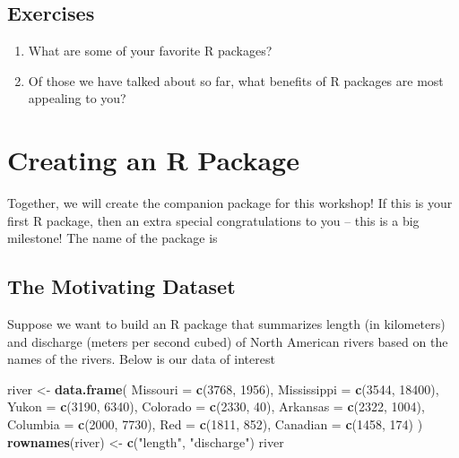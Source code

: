 \documentclass[
]{book}
\newenvironment{Shaded}{\begin{snugshade}}{\end{snugshade}}
\newcommand{\DataTypeTok}[1]{\textcolor[rgb]{0.13,0.29,0.53}{#1}}
\newcommand{\DecValTok}[1]{\textcolor[rgb]{0.00,0.00,0.81}{#1}}
\newcommand{\KeywordTok}[1]{\textcolor[rgb]{0.13,0.29,0.53}{\textbf{#1}}}
\newcommand{\NormalTok}[1]{#1}
\newcommand{\StringTok}[1]{\textcolor[rgb]{0.31,0.60,0.02}{#1}}
\begin{document}
\hypertarget{exercises}{%
\subsection{Exercises}\label{exercises}}

\begin{enumerate}
\def\labelenumi{\arabic{enumi}.}
\item
  What are some of your favorite R packages?
\item
  Of those we have talked about so far, what benefits of R packages are most appealing to you?
\end{enumerate}

\hypertarget{creating-an-r-package}{%
\section{Creating an R Package}\label{creating-an-r-package}}

Together, we will create the companion package for this workshop! If this is your first R package, then an extra special congratulations to you -- this is a big milestone! The name of the package is

\hypertarget{the-motivating-dataset}{%
\subsection{The Motivating Dataset}\label{the-motivating-dataset}}

Suppose we want to build an R package that summarizes length (in kilometers) and discharge (meters per second cubed) of North American rivers based on the names of the rivers. Below is our data of interest

\begin{Shaded}
\begin{Highlighting}[]
\NormalTok{river <-}\StringTok{ }\KeywordTok{data.frame}\NormalTok{(}
  \DataTypeTok{Missouri =} \KeywordTok{c}\NormalTok{(}\DecValTok{3768}\NormalTok{, }\DecValTok{1956}\NormalTok{),}
  \DataTypeTok{Mississippi =} \KeywordTok{c}\NormalTok{(}\DecValTok{3544}\NormalTok{, }\DecValTok{18400}\NormalTok{),}
  \DataTypeTok{Yukon =} \KeywordTok{c}\NormalTok{(}\DecValTok{3190}\NormalTok{, }\DecValTok{6340}\NormalTok{),}
  \DataTypeTok{Colorado =} \KeywordTok{c}\NormalTok{(}\DecValTok{2330}\NormalTok{, }\DecValTok{40}\NormalTok{),}
  \DataTypeTok{Arkansas =} \KeywordTok{c}\NormalTok{(}\DecValTok{2322}\NormalTok{, }\DecValTok{1004}\NormalTok{),}
  \DataTypeTok{Columbia =} \KeywordTok{c}\NormalTok{(}\DecValTok{2000}\NormalTok{, }\DecValTok{7730}\NormalTok{),}
  \DataTypeTok{Red =} \KeywordTok{c}\NormalTok{(}\DecValTok{1811}\NormalTok{, }\DecValTok{852}\NormalTok{),}
  \DataTypeTok{Canadian =} \KeywordTok{c}\NormalTok{(}\DecValTok{1458}\NormalTok{, }\DecValTok{174}\NormalTok{)}
\NormalTok{) }
\KeywordTok{rownames}\NormalTok{(river) <-}\StringTok{ }\KeywordTok{c}\NormalTok{(}\StringTok{"length"}\NormalTok{, }\StringTok{"discharge"}\NormalTok{)}
\NormalTok{river}
\end{Highlighting}
\end{Shaded}
\end{document}
